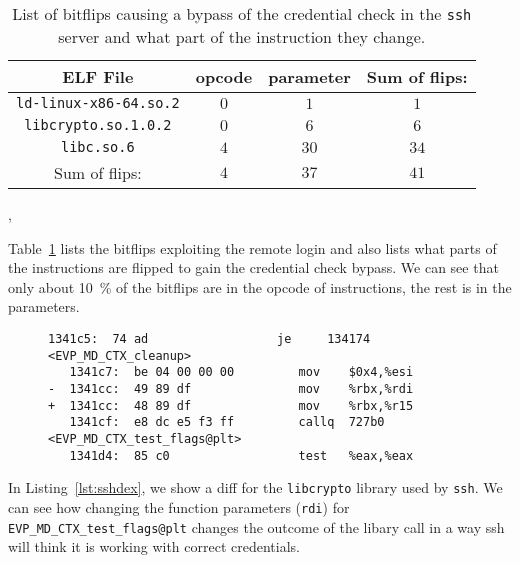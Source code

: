\begin{table}[!htb]
\centering
\begin{tabular}{c|cc|c}
ELF File & opcode & parameter & Sum of flips:      \\ \hline
\texttt{ld-linux-x86-64.so.2} & $0$ & $1$  & $1$   \\
\texttt{libcrypto.so.1.0.2}   & $0$ & $6$  & $6$   \\
\texttt{libc.so.6}            & $4$ & $30$ & $34$  \\ \hline
Sum of flips:                 & $4$ & $37$ & $41$
\end{tabular}
\caption{List of bitflips causing a bypass of the credential check in the
\texttt{ssh} server and what part of the instruction they change.},
\label{tab:sshflips}
\end{table}

Table~\ref{tab:sshflips} lists the bitflips exploiting the remote login and also
lists what parts of the instructions are flipped to gain the credential check
bypass. We can see that only about \SI{10}{\percent} of the bitflips are in the
opcode of instructions, the rest is in the parameters.

\begin{figure}
\begin{minipage}{\linewidth}
\begin{lstlisting}[style=diff,
                   caption={Diff for a bitflip applied to the
\texttt{libcrypto.so.1.0.2} binary in order to bypass a credential check. The
move from \texttt{rbx} to \texttt{rdi} is exchanged with a move to
\texttt{r15}, this changes the parameter for \texttt{EVP\_MD\_CTX\_test\_flags},
which is highly likely to result in a different outcome.},
label=lst:sshdex]
   1341c5:  74 ad                  je     134174 <EVP_MD_CTX_cleanup>
   1341c7:  be 04 00 00 00         mov    $0x4,%esi
-  1341cc:  49 89 df               mov    %rbx,%rdi
+  1341cc:  48 89 df               mov    %rbx,%r15
   1341cf:  e8 dc e5 f3 ff         callq  727b0 <EVP_MD_CTX_test_flags@plt>
   1341d4:  85 c0                  test   %eax,%eax
\end{lstlisting}
\end{minipage}
\end{figure}

In Listing~\ref{lst:sshdex}, we show a diff for the \texttt{libcrypto} library
used by \texttt{ssh}. We can see how changing the function parameters
(\texttt{rdi}) for \texttt{EVP\_MD\_CTX\_test\_flags@plt} changes the outcome of
the libary call in a way ssh will think it is working with correct credentials.


